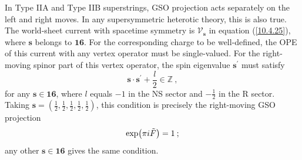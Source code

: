 In Type IIA and Type IIB superstrings, GSO projection acts separately on the left and right moves. In any supersymmetric heterotic theory, this is also true. The world-sheet current with spacetime symmetry is $\mathscr{V}_{\mathbf{s}}$ in equation (\ref{10.4.25}), where $\mathbf{s}$ belongs to $\mathbf{16}$. For the corresponding charge to be well-defined, the OPE of this current with any vertex operator must be single-valued. For the right-moving spinor part of this vertex operator, the spin eigenvalue $\mathbf{s}^{\prime}$ must satisfy
\begin{equation}
	\mathbf{s}\cdot \mathbf{s}^{\prime} + \frac{l}{2} \in \mathds{Z} \:, \label{11.2.7}
\end{equation}
for any $\mathbf{s}\in\mathbf{16}$, where $l$ equals $-1$ in the NS sector and $-\frac{1}{2}$ in the R sector. Taking $\mathbf{s}=(\frac{1}{2},\frac{1}{2},\frac{1}{2},\frac{1}{2},\frac{1}{2})$, this condition is precisely the right-moving GSO projection
\begin{equation}
	\exp(\pi i\tilde{F})=1\: ; \label{11.2.8}
\end{equation}
any other $\mathbf{s}\in\mathbf{16}$ gives the same condition.
